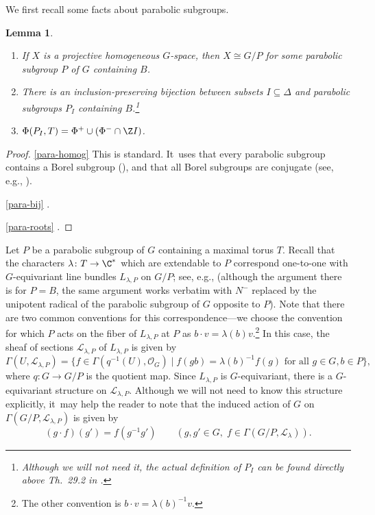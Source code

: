 \documentclass[JEP,XML,SOM,Unicode,published]{cedram}
\newenvironment{enumeratea}
{\bgroup\def\theenumi{\alph{enumi}}
\begin{enumerate}}
{\end{enumerate}\egroup}
\newtheorem{lem}[thm]{Lemma}
\begin{document}
\pagebreak[2]
We first recall some facts about parabolic subgroups.

\skpt
\begin{lem}\label{para-facts}
\begin{enumeratea}
\item\label{para-homog} If $X$ is a projective homogeneous $G$-space, then $X\cong G/P$ for some parabolic subgroup $P$ of $G$ containing $B$.

\item\label{para-bij} There is an inclusion-preserving bijection between subsets $I\subseteq \Delta$ and parabolic subgroups $P_I$ containing $B$.\footnote{Although we will not need it, the actual definition of $P_I$ can be found directly above Th.~29.2 in \cite{Hum75}.}
\item\label{para-roots} $\Phi(P_I, T) = \Phi^+\cup (\Phi^-\cap \Z I)$.
\end{enumeratea}
\end{lem}

\skpt
\begin{proof}
\eqref{para-homog} This is standard. It~uses that every parabolic subgroup contains a Borel subgroup (\cite[Cor.\,21.3.B.]{Hum75}), and that all Borel subgroups are conjugate (see, e.g., \cite[Th.\,21.3]{Hum75}).

\eqref{para-bij} \cite[Th.\,29.3]{Hum75}.

\eqref{para-roots} \cite[Th.\,30.1]{Hum75}.
\end{proof}

Let $P$ be a parabolic subgroup of $G$ containing a maximal torus $T$. Recall that the characters $\lambda\colon T\to \C^*$ which are extendable to $P$ correspond one-to-one with $G$-equivariant line bundles $L_{\lambda,P}$ on $G/P$; see, e.g., \cite[\S9.11]{Hotta} (although the argument there is for $P=B$, the same argument works verbatim with $N^{-}$ replaced by the unipotent radical of the parabolic subgroup of $G$ opposite to $P$). Note that there are two common conventions for this correspondence---we choose the convention for which $P$ acts on the fiber of $L_{\lambda,P}$ at $P$ as $b\cdot v = \lambda(b)v$.\footnote{The other convention is $b\cdot v = \lambda(b)^{-1}v$.} In this case, the sheaf of sections $\mathscr{L}_{\lambda,P}$ of $L_{\lambda,P}$ is given by
\begin{equation}\label{eq:borel-L-lambda}
\Gamma(U, \mathscr{L}_{\lambda,P}) = \{f\in \Gamma(q^{-1}(U), \mathscr{O}_G) \mid f(gb) = \lambda(b)^{-1}f(g)\text{ for all }g\in G, b\in P\},
\end{equation}
where $q\colon G\to G/P$ is the quotient map. Since $L_{\lambda,P}$ is $G$-equivariant, there is a $G$-equivariant structure on $\mathscr{L}_{\lambda,P}$. Although we will not need to know this structure explicitly, it~may help the reader to note that the induced action of $G$ on $\Gamma(G/P, \mathscr{L}_{\lambda,P})$ is given by
\begin{equation*}
(g\cdot f)(g') = f(g^{-1}g')\qquad (g,g'\in G,\; f\in \Gamma(G/P, \mathscr{L}_\lambda)).
\end{equation*}
\end{document}
